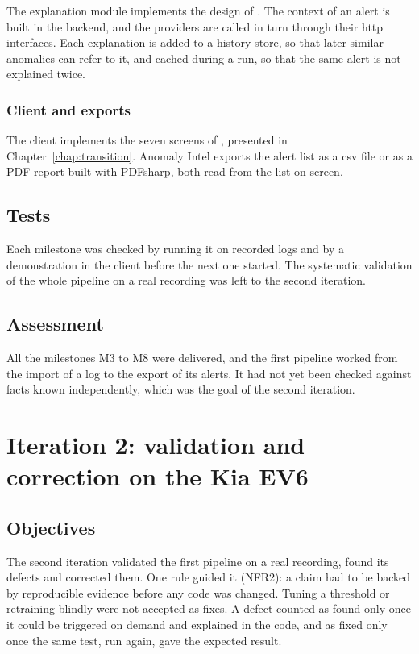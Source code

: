 The explanation module implements the design of . The context of an alert is built in the backend, and the providers are called in turn through their \gls{http} interfaces. Each explanation is added to a history store, so that later similar anomalies can refer to it, and cached during a run, so that the same alert is not explained twice.

\subsubsection{Client and exports}

The client implements the seven screens of , presented in Chapter~\ref{chap:transition}. Anomaly Intel exports the alert list as a \gls{csv} file or as a PDF report built with PDFsharp, both read from the list on screen.

\subsection{Tests}

Each milestone was checked by running it on recorded logs and by a demonstration in the client before the next one started. The systematic validation of the whole pipeline on a real recording was left to the second iteration.

\subsection{Assessment}

All the milestones M3 to M8 were delivered, and the first pipeline worked from the import of a log to the export of its alerts. It had not yet been checked against facts known independently, which was the goal of the second iteration.

\section{Iteration 2: validation and correction on the Kia EV6}
\label{sec:it2}

\subsection{Objectives}

The second iteration validated the first pipeline on a real recording, found its defects and corrected them. One rule guided it (NFR2): a claim had to be backed by reproducible evidence before any code was changed. Tuning a threshold or retraining blindly were not accepted as fixes. A defect counted as found only once it could be triggered on demand and explained in the code, and as fixed only once the same test, run again, gave the expected result.

